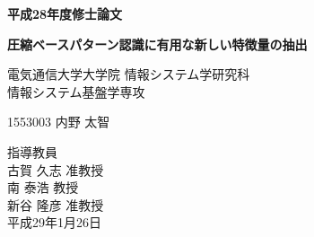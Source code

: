 ﻿

\begin{titlepage}
\vspace*{0.5cm}
\begin{center}
\LARGE\bf
平成28年度\hspace{1cm}修士論文\\
\end{center}
\vspace{1cm}
\begin{center}
\LARGE\bf{圧縮ベースパターン認識に有用な新しい特徴量の抽出%
}
\end{center}
\vspace{1cm}
\begin{center}
\Large

\vspace{0.5cm}
電気通信大学大学院 情報システム学研究科\\
情報システム基盤学専攻\\

\vspace{1cm}

\LARGE
1553003 \hspace{0.3cm} 内野 太智

\vspace{1cm}
\Large
指導教員\\
古賀 久志 准教授\\
南 泰浩 教授\\
新谷 隆彦 准教授\\

\vspace{1cm}
平成29年1月26日
\end{center}
\end{titlepage}

